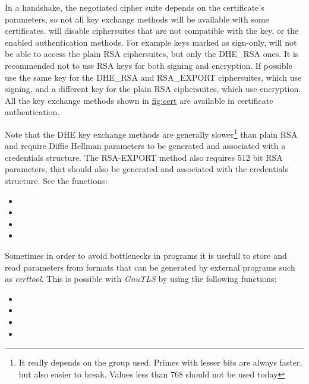 \par
In a handshake, the negotiated cipher suite depends on the 
certificate's parameters, so not all key exchange methods will be available
with some certificates. \gnutls{} will disable ciphersuites that are not compatible with the key, or
the enabled authentication methods. For example keys marked as sign-only, will not be able to
access the plain RSA ciphersuites, but only the DHE\_RSA ones. It is
recommended not to use RSA keys for both signing and encryption. If possible
use the same key for the DHE\_RSA and RSA\_EXPORT ciphersuites, which use signing,
and a different key for the plain RSA ciphersuites, which use encryption.
All the key exchange methods shown in \hyperref{figure}{figure }{}{fig:cert} are
available in certificate authentication. 

Note that the DHE key exchange methods are generally slower\footnote{It really depends
on the group used. Primes with lesser bits are always faster, but also easier to break. 
Values less than 768 should not be used today} 
than plain RSA and require Diffie Hellman parameters to be generated and associated with a credentials 
structure. The RSA-EXPORT method also requires 512 bit RSA parameters, that should 
also be generated and associated with the credentials structure. See the functions:
\begin{itemize}
\item {}
\item {}
\item {}
\item {}
\end{itemize}

Sometimes in order to avoid bottlenecks in programs it is usefull to store
and read parameters from formats that can be generated by external programs such
as \emph{certtool}. This is possible with \emph{GnuTLS} by using the following
functions:

\begin{itemize}
\item {}
\item {}
\item {}
\item {}
\end{itemize}

